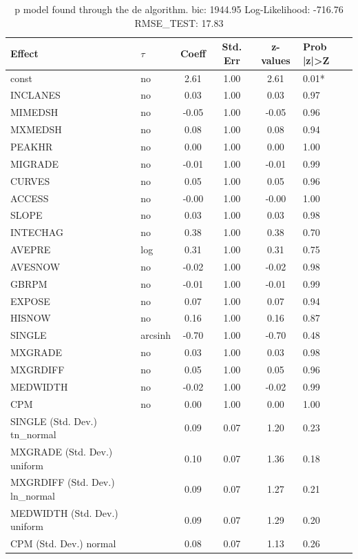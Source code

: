 \begin{table}
	\caption{p model found through the de algorithm. bic: 1944.95 Log-Likelihood: -716.76 RMSE_TEST: 17.83}
	\begin{center}
		\begin{tabular}{|l|l|c|c|c|l|}
			\hline
			Effect & $\tau$ & Coeff & Std. Err & z-values & Prob |z|>Z \\
			\hline
			const & no & 2.61 & 1.00 & 2.61 & 0.01* \\
			\hline
			INCLANES & no & 0.03 & 1.00 & 0.03 & 0.97 \\
			\hline
			MIMEDSH & no & -0.05 & 1.00 & -0.05 & 0.96 \\
			\hline
			MXMEDSH & no & 0.08 & 1.00 & 0.08 & 0.94 \\
			\hline
			PEAKHR & no & 0.00 & 1.00 & 0.00 & 1.00 \\
			\hline
			MIGRADE & no & -0.01 & 1.00 & -0.01 & 0.99 \\
			\hline
			CURVES & no & 0.05 & 1.00 & 0.05 & 0.96 \\
			\hline
			ACCESS & no & -0.00 & 1.00 & -0.00 & 1.00 \\
			\hline
			SLOPE & no & 0.03 & 1.00 & 0.03 & 0.98 \\
			\hline
			INTECHAG & no & 0.38 & 1.00 & 0.38 & 0.70 \\
			\hline
			AVEPRE & log & 0.31 & 1.00 & 0.31 & 0.75 \\
			\hline
			AVESNOW & no & -0.02 & 1.00 & -0.02 & 0.98 \\
			\hline
			GBRPM & no & -0.01 & 1.00 & -0.01 & 0.99 \\
			\hline
			EXPOSE & no & 0.07 & 1.00 & 0.07 & 0.94 \\
			\hline
			HISNOW & no & 0.16 & 1.00 & 0.16 & 0.87 \\
			\hline
			SINGLE & arcsinh & -0.70 & 1.00 & -0.70 & 0.48 \\
			\hline
			MXGRADE & no & 0.03 & 1.00 & 0.03 & 0.98 \\
			\hline
			MXGRDIFF & no & 0.05 & 1.00 & 0.05 & 0.96 \\
			\hline
			MEDWIDTH & no & -0.02 & 1.00 & -0.02 & 0.99 \\
			\hline
			CPM & no & 0.00 & 1.00 & 0.00 & 1.00 \\
			\hline
			SINGLE (Std. Dev.) tn_normal &  & 0.09 & 0.07 & 1.20 & 0.23 \\
			\hline
			MXGRADE (Std. Dev.) uniform &  & 0.10 & 0.07 & 1.36 & 0.18 \\
			\hline
			MXGRDIFF (Std. Dev.) ln_normal &  & 0.09 & 0.07 & 1.27 & 0.21 \\
			\hline
			MEDWIDTH (Std. Dev.) uniform &  & 0.09 & 0.07 & 1.29 & 0.20 \\
			\hline
			CPM (Std. Dev.) normal &  & 0.08 & 0.07 & 1.13 & 0.26 \\
			\hline
		\end{tabular}
	\end{center}
\end{table}